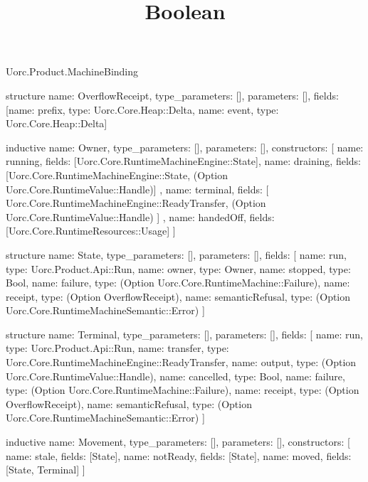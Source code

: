 \begin{lexlean}{Uorc.Product.MachineBinding}
\title{Boolean}
\begin{semanticmodule}
structure{
  name: OverflowReceipt,
  type_parameters: [],
  parameters: [],
  fields: [{name: prefix, type: Uorc.Core.Heap::Delta}, {name: event, type: Uorc.Core.Heap::Delta}]
}

inductive{
  name: Owner,
  type_parameters: [],
  parameters: [],
  constructors: [
    {name: running, fields: [Uorc.Core.RuntimeMachineEngine::State]},
    {
      name: draining,
      fields: [Uorc.Core.RuntimeMachineEngine::State, (Option Uorc.Core.RuntimeValue::Handle)]
    },
    {
      name: terminal,
      fields: [
        Uorc.Core.RuntimeMachineEngine::ReadyTransfer,
        (Option Uorc.Core.RuntimeValue::Handle)
      ]
    },
    {name: handedOff, fields: [Uorc.Core.RuntimeResources::Usage]}
  ]
}

structure{
  name: State,
  type_parameters: [],
  parameters: [],
  fields: [
    {name: run, type: Uorc.Product.Api::Run},
    {name: owner, type: Owner},
    {name: stopped, type: Bool},
    {name: failure, type: (Option Uorc.Core.RuntimeMachine::Failure)},
    {name: receipt, type: (Option OverflowReceipt)},
    {name: semanticRefusal, type: (Option Uorc.Core.RuntimeMachineSemantic::Error)}
  ]
}

structure{
  name: Terminal,
  type_parameters: [],
  parameters: [],
  fields: [
    {name: run, type: Uorc.Product.Api::Run},
    {name: transfer, type: Uorc.Core.RuntimeMachineEngine::ReadyTransfer},
    {name: output, type: (Option Uorc.Core.RuntimeValue::Handle)},
    {name: cancelled, type: Bool},
    {name: failure, type: (Option Uorc.Core.RuntimeMachine::Failure)},
    {name: receipt, type: (Option OverflowReceipt)},
    {name: semanticRefusal, type: (Option Uorc.Core.RuntimeMachineSemantic::Error)}
  ]
}

inductive{
  name: Movement,
  type_parameters: [],
  parameters: [],
  constructors: [
    {name: stale, fields: [State]},
    {name: notReady, fields: [State]},
    {name: moved, fields: [State, Terminal]}
  ]
}


\end{semanticmodule}
\end{lexlean}

